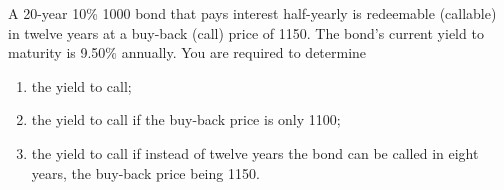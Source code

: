 \documentclass[12pt,a4paper]{article}
\begin{document}
\begin{question} A 20-year 10\% 1000 bond that pays interest half-yearly is redeemable (callable) in twelve years at a buy-back (call) price of 1150. The bond's current yield to maturity is 9.50\% annually. You are required to determine 
\begin{enumerate}[label=(\alph*),font=\itshape]
	\item the yield to call;
	\item the yield to call if the buy-back price is only 1100;
	\item the yield to call if instead of twelve years the bond can be called in eight years, the buy-back price being 1150.
\end{enumerate}
\end{question}
%	
%	
%	
%	
%		
%		
\end{document}
